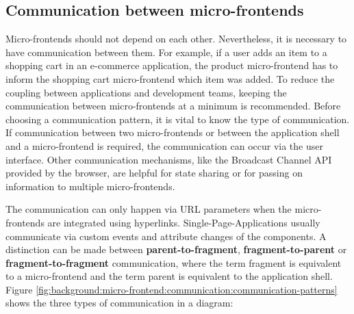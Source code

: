 \subsection{Communication between micro-frontends}\label{subsection:background:micro-frontend:communication-patterns}

Micro-frontends should not depend on each other. Nevertheless, it is necessary to have communication between them. For example, if a user adds an item to a shopping cart in an e-commerce application, the product micro-frontend has to inform the shopping cart micro-frontend which item was added. To reduce the coupling between applications and development teams, keeping the communication between micro-frontends at a minimum is recommended. Before choosing a communication pattern, it is vital to know the type of communication. If communication between two micro-frontends or between the application shell and a micro-frontend is required, the communication can occur via the user interface. \cite{book:2020:geers:background:micro-frontends:micro-frontends-in-action} Other communication mechanisms, like the Broadcast Channel \ac{API} provided by the browser, are helpful for state sharing or for passing on information to multiple micro-frontends. \cite{misc:-:background:micro-frontends:broadcast-channel-api} 

\bigskip

\noindent The communication can only happen via URL parameters when the micro-frontends are integrated using hyperlinks. Single-Page-Applications usually communicate via custom events and attribute changes of the components. \cite[100]{book:2020:geers:background:micro-frontends:micro-frontends-in-action} \cite[315-316]{book:2019:farrell:background:micro-frontends:web-components-in-action} A distinction can be made between \textbf{parent-to-fragment}, \textbf{fragment-to-parent} or \textbf{fragment-to-fragment} communication, where the term fragment is equivalent to a micro-frontend and the term parent is equivalent to the application shell. \cite{book:2020:geers:background:micro-frontends:micro-frontends-in-action} Figure \ref{fig:background:micro-frontend:communication:communication-patterns} shows the three types of communication in a diagram:

